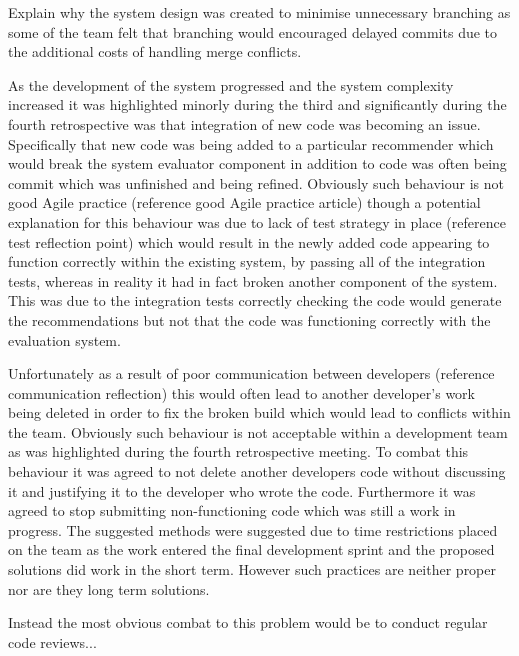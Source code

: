 \documentclass{l3proj}
\begin{document}
Explain why the system design was created to minimise unnecessary branching as some of the team felt that branching would encouraged delayed commits due to the additional costs of handling merge conflicts.

As the development of the system progressed and the system complexity increased it was highlighted minorly during the third and significantly during the fourth retrospective was that integration of new code was becoming an issue. Specifically that new code was being added to a particular recommender which would break the system evaluator component in addition to code was often being commit which was unfinished and being refined. Obviously such behaviour is not good Agile practice (reference good Agile practice article) though a potential explanation for this behaviour was due to lack of test strategy in place (reference test reflection point) which would result in the newly added code appearing to function correctly within the existing system, by passing all of the integration tests, whereas in reality it had in fact broken another component of the system. This was due to the integration tests correctly checking the code would generate the recommendations but not that the code was functioning correctly with the evaluation system.

Unfortunately as a result of poor communication between developers (reference communication reflection) this would often lead to another developer's work being deleted in order to fix the broken build which would lead to conflicts within the team. Obviously such behaviour is not acceptable within a development team as was highlighted during the fourth retrospective meeting. To combat this behaviour it was agreed to not delete another developers code without discussing it and justifying it to the developer who wrote the code. Furthermore it was agreed to stop submitting non-functioning code which was still a work in progress. The suggested methods were suggested due to time restrictions placed on the team as the work entered the final development sprint and the proposed solutions did work in the short term. However such practices are neither proper nor are they long term solutions. 

Instead the most obvious combat to this problem would be to conduct regular code reviews...
\end{document}
